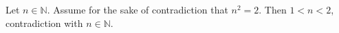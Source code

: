 Let $n \in \mathbb{N}$.
Assume for the sake of contradiction that $n^{2} = 2$.
Then $1 < n < 2$, contradiction with $n \in \mathbb{N}$.